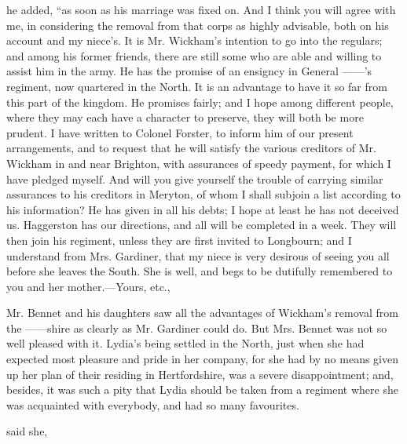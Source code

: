  he added, “as soon as his marriage was fixed on. And I think you will agree with me, in considering the removal from that corps as highly advisable, both on his account and my niece's. It is Mr. Wickham's intention to go into the regulars; and among his former friends, there are still some who are able and willing to assist him in the army. He has the promise of an ensigncy in General ------'s regiment, now quartered in the North. It is an advantage to have it so far from this part of the kingdom. He promises fairly; and I hope among different people, where they may each have a character to preserve, they will both be more prudent. I have written to Colonel Forster, to inform him of our present arrangements, and to request that he will satisfy the various creditors of Mr. Wickham in and near Brighton, with assurances of speedy payment, for which I have pledged myself. And will you give yourself the trouble of carrying similar assurances to his creditors in Meryton, of whom I shall subjoin a list according to his information? He has given in all his debts; I hope at least he has not deceived us. Haggerston has our directions, and all will be completed in a week. They will then join his regiment, unless they are first invited to Longbourn; and I understand from Mrs. Gardiner, that my niece is very desirous of seeing you all before she leaves the South. She is well, and begs to be dutifully remembered to you and her mother.---Yours, etc.,


Mr. Bennet and his daughters saw all the advantages of Wickham's removal from the ------shire as clearly as Mr. Gardiner could do. But Mrs. Bennet was not so well pleased with it. Lydia's being settled in the North, just when she had expected most pleasure and pride in her company, for she had by no means given up her plan of their residing in Hertfordshire, was a severe disappointment; and, besides, it was such a pity that Lydia should be taken from a regiment where she was acquainted with everybody, and had so many favourites.

 said she, 

